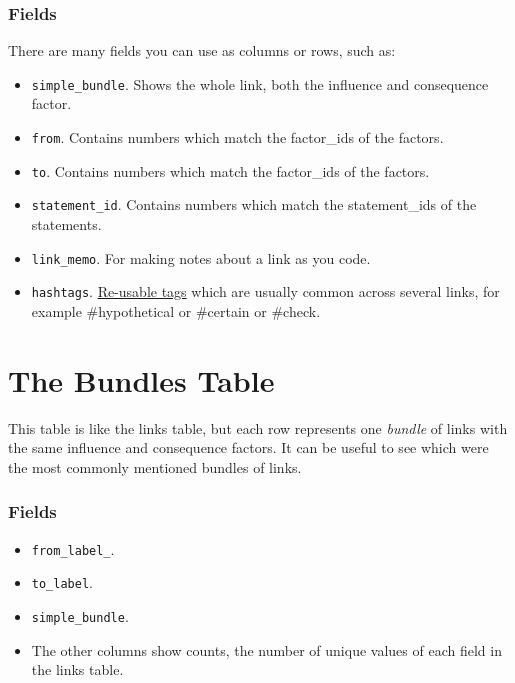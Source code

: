 \documentclass[
]{book}
\providecommand{\tightlist}{%
  \setlength{\itemsep}{0pt}\setlength{\parskip}{0pt}}
\begin{document}
\hypertarget{fields-1}{%
\subsection{Fields}\label{fields-1}}

There are many fields you can use as columns or rows, such as:

\begin{itemize}
\tightlist
\item
  \texttt{simple\_bundle}. Shows the whole link, both the influence and consequence factor.
\item
  \texttt{from}. Contains numbers which match the factor\_ids of the factors.
\item
  \texttt{to}. Contains numbers which match the factor\_ids of the factors.
\item
  \texttt{statement\_id}. Contains numbers which match the statement\_ids of the statements.
\item
  \texttt{link\_memo}. For making notes about a link as you code.
\item
  \texttt{hashtags}. \protect\hyperlink{xhashtags}{Re-usable tags} which are usually common across several links, for example \#hypothetical or \#certain or \#check.
\end{itemize}

\hypertarget{xthe-bundles-table-old}{%
\chapter{The Bundles Table}\label{xthe-bundles-table-old}}

This table is like the links table, but each row represents one \emph{bundle} of links with the same influence and consequence factors. It can be useful to see which were the most commonly mentioned bundles of links.

\hypertarget{fields-2}{%
\subsection{Fields}\label{fields-2}}

\begin{itemize}
\tightlist
\item
  \texttt{from\_label\_}.
\item
  \texttt{to\_label}.
\item
  \texttt{simple\_bundle}.
\item
  The other columns show counts, the number of unique values of each field in the links table.
\end{itemize}
\end{document}
